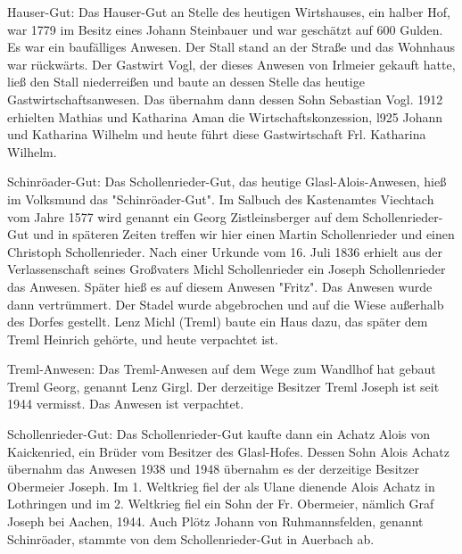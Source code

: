 Hauser-Gut: Das Hauser-Gut an Stelle des heutigen Wirtshauses, ein halber Hof,
war 1779 im Besitz eines Johann Steinbauer und war geschätzt auf 600 Gulden. Es
war ein baufälliges Anwesen. Der Stall stand an der Straße und das Wohnhaus war
rückwärts. Der Gastwirt Vogl, der dieses Anwesen von Irlmeier gekauft hatte,
ließ den Stall niederreißen und baute an dessen Stelle das heutige
Gastwirtschaftsanwesen. Das übernahm dann dessen Sohn Sebastian Vogl. 1912
erhielten Mathias und Katharina Aman die Wirtschaftskonzession, l925 Johann und
Katharina Wilhelm und heute führt diese Gastwirtschaft Frl. Katharina Wilhelm.

Schinröader-Gut: Das Schollenrieder-Gut, das heutige Glasl-Alois-Anwesen, hieß
im Volksmund das "Schinröader-Gut". Im Salbuch des Kastenamtes Viechtach vom
Jahre 1577 wird genannt ein Georg Zistleinsberger auf dem Schollenrieder-Gut und
in späteren Zeiten treffen wir hier einen Martin Schollenrieder und einen
Christoph Schollenrieder. Nach einer Urkunde vom 16. Juli 1836 erhielt aus der
Verlassenschaft seines Großvaters Michl Schollenrieder ein Joseph Schollenrieder
das Anwesen. Später hieß es auf diesem Anwesen "Fritz". Das Anwesen wurde dann
vertrümmert. Der Stadel wurde abgebrochen und auf die Wiese außerhalb des Dorfes
gestellt. Lenz Michl (Treml) baute ein Haus dazu, das später dem Treml Heinrich
gehörte, und heute verpachtet ist.

Treml-Anwesen: Das Treml-Anwesen auf dem Wege zum Wandlhof hat gebaut Treml
Georg, genannt Lenz Girgl. Der derzeitige Besitzer Treml Joseph ist seit 1944
vermisst. Das Anwesen ist verpachtet.

Schollenrieder-Gut: Das Schollenrieder-Gut kaufte dann ein Achatz Alois von
Kaickenried, ein Brüder vom Besitzer des Glasl-Hofes. Dessen Sohn Alois Achatz
übernahm das Anwesen 1938 und 1948 übernahm es der derzeitige Besitzer Obermeier
Joseph. Im 1. Weltkrieg fiel der als Ulane dienende Alois Achatz in Lothringen
und im 2. Weltkrieg fiel ein Sohn der Fr. Obermeier, nämlich Graf Joseph bei
Aachen, 1944. Auch Plötz Johann von Ruhmannsfelden, genannt Schinröader, stammte
von dem Schollenrieder-Gut in Auerbach ab.

